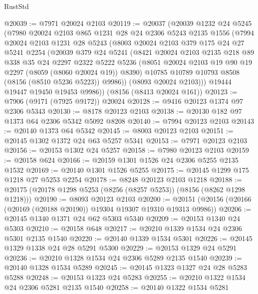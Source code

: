 \begin{lexlean}{RustStd}
\begin{coremodule}
{\begin{coremodule}
{{{{{{{{{{{{{{{{{{{{{{{{{{{{{{{{{{@20039 := @7971 @20024 @2103
@20119 := @20037
    (@20039
      @1232
      @24
      @5245
      (@7980
        @20024
        @2103
        @865
        @1231
        @28
        @24
        @2306
        @5243
        @2135
        @1556
        (@7994
          @20024
          @2103
          @1231
          @28
          @5243
          (@8003
            @20024
            @2103
            @379
            @175
            @24
            @27
            @5241
            @2254
            (@20039
              @379
              @24
              @5241
              (@8421
                @20024
                @2103
                @2135
                @218
                @89
                @338
                @35
                @24
                @2297
                @2322
                @5222
                @5236
                (@8051 @20024 @2103 @19 @90 @19 @2297 (@8059 (@8060 @20024 @19)) @8390)
                @10785
                @10789
                @10793
                @8508
                (@8156 (@8510 @5236 @5223))
                @9986))
            (@8093 @20024 @2103)))
        @19444
        @19447
        @19450
        @19453
        @9986))
    (@8156 (@8413 @20024 @161))
@20123 := @7906 (@9171 (@7925 @9172)) @20024
@20128 := @9416 @20123 @1374 @97 @2306 @5343
@20130 := @8178 @20123 @2103
@20138 := @20130 @182 @97 @1373 @64 @2306 @5342 @5092 @8208
@20140 := @7994 @20123 @2103
@20143 := @20140 @1373 @64 @5342
@20145 := @8003 @20123 @2103
@20151 := @20145 @1302 @1372 @24 @63 @5257 @5341
@20153 := @7971 @20123 @2103
@20156 := @20153 @1302 @24 @5257
@20158 := @7980 @20123 @2103
@20159 := @20158 @624
@20166 := @20159 @1301 @1526 @24 @2306 @5255 @2135 @1532
@20169 := @20140 @1301 @1526 @5255
@20175 := @20145 @1299 @175 @1218 @27 @5253 @2254
@20178 := @8248 @20123 @2103 @1218
@20188 := @20175 (@20178 @1298 @5253 (@8256 (@8257 @5253)) (@8156 (@8262 @1298 @1218)))
@20190 := @8093 @20123 @2103
@20200 := @20151 (@20156 (@20166 (@20169 (@20188 @20190)) @19304 @19307 @19310 @19313 @9986))
@20206 := @20145 @1340 @1371 @24 @62 @5303 @5340
@20209 := @20153 @1340 @24 @5303
@20210 := @20158 @648
@20217 := @20210 @1339 @1534 @24 @2306 @5301 @2135 @1540
@20220 := @20140 @1339 @1534 @5301
@20226 := @20145 @1329 @1338 @24 @28 @5291 @5300
@20229 := @20153 @1329 @24 @5291
@20236 := @20210 @1328 @1534 @24 @2306 @5289 @2135 @1540
@20239 := @20140 @1328 @1534 @5289
@20245 := @20145 @1323 @1327 @24 @28 @5283 @5288
@20248 := @20153 @1323 @24 @5283
@20255 := @20210 @1322 @1534 @24 @2306 @5281 @2135 @1540
@20258 := @20140 @1322 @1534 @5281
}}}}}}}}}}}}}}}}}}}}}}}}}}}}}}}}}}
\end{coremodule}}
\end{coremodule}
\end{lexlean}
